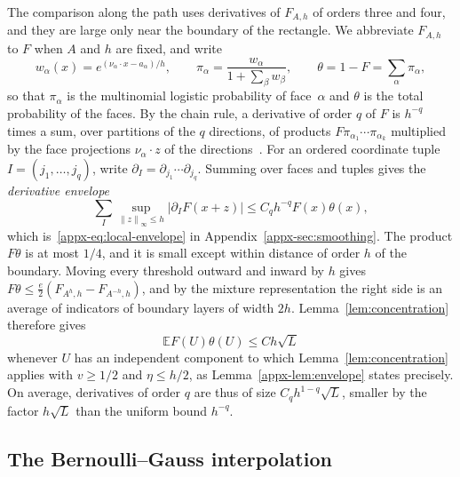\documentclass[11pt,letterpaper]{article}
\newif\ifshowrev
\newenvironment{revblock}{\ifshowrev\color{revblue}%
\hypersetup{linkcolor=revblue,citecolor=revblue,urlcolor=revblue}\fi}{}
\newif\ifshowskill
\newcommand{\skl}[1]{\ifshowskill{\color{revblue}%
\hypersetup{linkcolor=revblue,citecolor=revblue,urlcolor=revblue}#1}\else#1\fi}
\newif\ifshownat
\newcommand{\nas}[1]{\ifshownat{\color{revblue}#1}\else#1\fi}
\theoremstyle{remark}
\newcommand{\E}{\mathbb E}
\newcommand{\norm}[1]{\left\lVert#1\right\rVert}
\begin{document}
\begin{revblock}
The comparison along the path uses derivatives of \(F_{A,h}\) of orders
three and four, and they are large only near the boundary of the
rectangle. We abbreviate \(F_{A,h}\) to \(F\) when \(A\) and \(h\) are
fixed, and write
\[
 w_\alpha(x)=e^{(\nu_\alpha\cdot x-a_\alpha)/h},\qquad
 \pi_\alpha=\frac{w_\alpha}{1+\sum_\beta w_\beta},\qquad
 \theta=1-F=\sum_\alpha\pi_\alpha,
\]
so that \(\pi_\alpha\) is the multinomial logistic probability of
face~\(\alpha\) and \(\theta\) is the total probability of the faces. By
the chain rule, a derivative of order \(q\) of \(F\) is \(h^{-q}\) times a
sum, over partitions of the \(q\) directions, of products
\(F\pi_{\alpha_1}\cdots\pi_{\alpha_k}\) multiplied by the face projections
\(\nu_\alpha\cdot z\) of the directions~\cite[Lemma~13]{GaoZhang}. For an
ordered coordinate tuple \(I=(j_1,\ldots,j_q)\), write
\(\partial_I=\partial_{j_1}\cdots\partial_{j_q}\). Summing over faces and
tuples gives the \emph{derivative envelope}
\[
 \sum_I\sup_{\norm z_\infty\le h}|\partial_IF(x+z)|
 \le C_qh^{-q}F(x)\theta(x),
\]
which is~\eqref{appx-eq:local-envelope} in
Appendix~\ref{appx-sec:smoothing}. The product \(F\theta\) is at most
\(1/4\), and it is small except within distance of order \(h\) of the
boundary. Moving every threshold outward and inward by \(h\) gives
\(F\theta\le\frac e2(F_{A^h,h}-F_{A^{-h},h})\), and by the mixture
representation the right side is an average of indicators of boundary
\skl{layers} of width \(2h\). Lemma~\ref{lem:concentration} therefore gives
\[
 \E F(U)\theta(U)\le Ch\sqrt L
\]
whenever \(U\) has an independent component to which
Lemma~\ref{lem:concentration} applies with \(v\ge1/2\) and
\(\eta\le h/2\), as Lemma~\ref{appx-lem:envelope} states precisely. On
average, derivatives of order \(q\) are thus of size
\(C_qh^{1-q}\sqrt L\), smaller by the factor \(h\sqrt L\) than the
uniform bound \(h^{-q}\).
\end{revblock}

\subsection{\texorpdfstring{\nas{The Bernoulli--Gauss interpolation}}{The Bernoulli-Gauss interpolation}}
\label{sec:outline-path}
\end{document}

